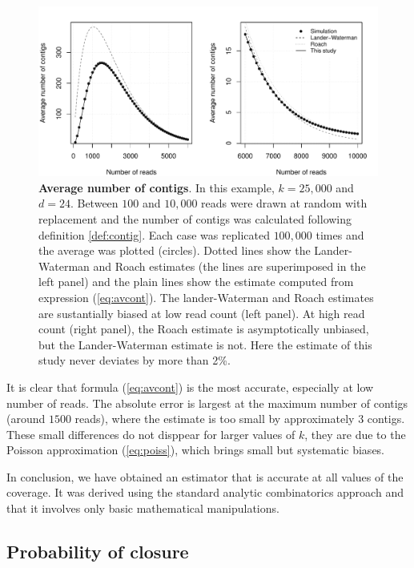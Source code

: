 \documentclass{article}
\begin{document}
\begin{figure}[h]
\centering
\includegraphics[scale=0.585]{Fig3.pdf}
\caption{\textbf{Average number of contigs}. In this example, $k=25,000$
and $d=24$. Between $100$ and $10,000$ reads were drawn at random with
replacement and the number of contigs was calculated following definition
\ref{def:contig}. Each case was replicated $100,000$ times and the average
was plotted (circles). Dotted lines show the Lander-Waterman and Roach
estimates (the lines are superimposed in the left panel) and the plain
lines show the estimate computed from expression (\ref{eq:avcont}).
The lander-Waterman and Roach estimates are sustantially biased at low
read count (left panel). At high read count (right panel), the Roach
estimate is asymptotically unbiased, but the Lander-Waterman estimate is
not. Here the estimate of this study never deviates by more than 2\%.}
\label{fig:avcontig}
\end{figure}

It is clear that formula (\ref{eq:avcont}) is the most accurate,
especially at low number of reads. The absolute error is largest at the
maximum number of contigs (around $1500$ reads), where the estimate is too
small by approximately $3$ contigs. These small differences do not
disppear for larger values of $k$, they are due to the Poisson
approximation (\ref{eq:poiss}), which brings small but systematic biases.

In conclusion, we have obtained an estimator that is accurate at all
values of the coverage. It was derived using the standard analytic
combinatorics approach and that it involves only basic mathematical
manipulations.





\subsection{Probability of closure}
\end{document}
